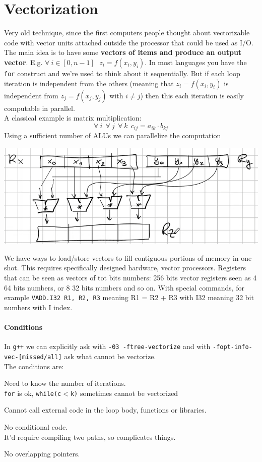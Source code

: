 \documentclass[10pt]{report}
\begin{document}
\section{Vectorization}
Very old technique, since the first computers people thought about vectorizable code with vector units attached outside the processor that could be used as I/O. The main idea is to have some \textbf{vectors of items and produce an output vector}. E.g. $\forall\:i\in[0, n-1]\:\:\:z_i = f(x_i, y_i)$. In most languages you have the \texttt{for} construct and we're used to think about it sequentially. But if each loop iteration is independent from the others (meaning that $z_i = f(x_i, y_i)$ is independent from $z_j = f(x_j, y_j)$ with $i\neq j$) then this each iteration is easily computable in parallel.\\
A classical example is matrix multiplication: $$\forall\:i\:\:\forall\:j\:\:\forall\:k\:\:c_{ij} = a_{ik}\cdot b_{kj}$$
Using a sufficient number of ALUs we can parallelize the computation
\begin{center}
	\includegraphics[scale=0.5]{38.png}
\end{center}
We have ways to load/store vectors to fill contiguous portions of memory in one shot. This requires specifically designed hardware, vector processors. Registers that can be seen as vectors of tot bits numbers: 256 bits vector registers seen as 4 64 bits numbers, or 8 32 bits numbers and so on. With special commands, for example \texttt{VADD.I32 R1, R2, R3} meaning R1 = R2 + R3 with I32 meaning 32 bit numbers with I index.
\paragraph{Conditions} In \texttt{g++} we can explicitly ask with \texttt{-03 -ftree-vectorize} and with \texttt{-fopt-info-vec-[missed/all]} ask what cannot be vectorize.\\
The conditions are:
\begin{list}{}{}
	\item Need to know the number of iterations.\\
	\texttt{for} is ok, \texttt{while(c$<$k)} sometimes cannot be vectorized
	\item Cannot call external code in the loop body, functions or libraries.
	\item No conditional code.\\
	It'd require compiling two paths, so complicates things.
	\item No overlapping pointers.
\end{list}
\end{document}
